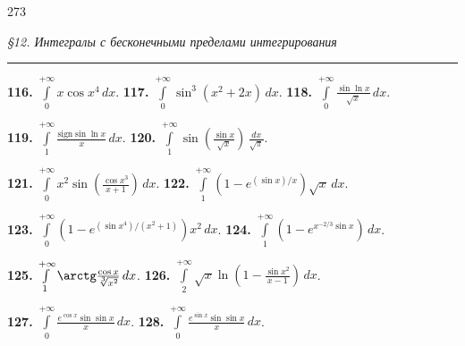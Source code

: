 \documentclass[11pt, a4paper]{article}
\begin{document}
	\LARGE
	

	\begin{flushright}
		273
	\end{flushright}
	\vspace*{-57pt}
	\begin{center}
		\textit{\S12. Интегралы с бесконечными пределами интегрирования}\
	\end{center}
	 
	\vspace*{-39pt}
	\noindent \rule{\textwidth}{0.5pt}
	
	
	\vspace*{10pt}

	\textbf{116.}
	$\int\limits_0^{+\infty} x \cos x^4 \, dx$. \hspace{0.1cm}
	\textbf{117.}
	$\int\limits_0^{+\infty} \sin^3(x^2 + 2x) \, dx$. \hspace{0.1cm}
	\textbf{118.}
	$\int\limits_0^{+\infty} \frac{\sin\ln x}{\sqrt{x}} \, dx$. \hspace{0.1cm}
	
	\textbf{119.}
	$\int\limits_1^{+\infty} \frac{\text{sign}\sin\ln x}{x} \, dx$. \hspace{0.1cm}
	\textbf{120.}
	$\int\limits_1^{+\infty} \sin(\frac{\sin x}{\sqrt{x}}) \, \frac{dx}{\sqrt{\pi}}$. \hspace{0.1cm}

	\textbf{121.}
	$\int\limits_0^{+\infty} x^2 \sin(\frac{\cos x^3}{x + 1}) \, dx$. \hspace{0.1cm}
	\textbf{122.}
	$\int\limits_1^{+\infty} (1 - e^{(\sin x)/x})\sqrt{x} \, dx$. \hspace{0.1cm}
	
	\textbf{123.}
	$\int\limits_0^{+\infty} (1 - e^{(\sin x^4)/(x^2 + 1)})x^2 \, dx$. \hspace{0.1cm}
	\textbf{124.}
	$\int\limits_1^{+\infty} (1 - e^{x^{-2/3}\sin x}) \, dx$. \hspace{0.1cm}
	
	\textbf{125.}
	$\int\limits_1^{+\infty} \arctg\frac{\cos x}{\sqrt[3]{x^2}} \, dx$. \hspace{0.1cm}
	\textbf{126.}
	$\int\limits_2^{+\infty} \sqrt{x}\ln(1 - \frac{\sin x^2}{x - 1}) \, dx$. \hspace{0.1cm}
	
	\textbf{127.}
	$\int\limits_0^{+\infty} \frac{e^{\cos x}\sin\sin x}{x} \, dx$. \hspace{0.1cm}
	\textbf{128.}
	$\int\limits_0^{+\infty} \frac{e^{\sin x}\sin\sin x}{x} \, dx$. \hspace{0.1cm}
	
\end{document}
